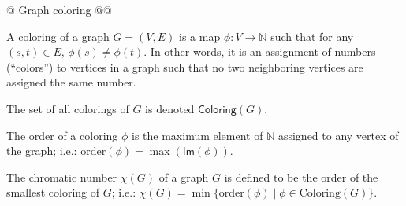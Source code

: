 \documentclass[]{article}
\newcommand{\textbs}[1]{{\sffamily\fontseries{sbc}\selectfont #1}}
\newcommand{\mbb}[1]{\ensuremath{\mathbb{#1}}}     %
\newcommand{\mrm}[1]{\ensuremath{\mathrm{#1}}}     %
\newcommand{\msf}[1]{\ensuremath{\mathsf{#1}}}     %
\newcommand{\define}[1]{\textbs{#1}}
\begin{document}
\begin{easylist}[itemize]
@ Graph coloring
@@ {%
  A \define{coloring} of a graph $G = (V, E)$ is a map $\phi : V \to \mbb{N}$
  such that for any $(s, t) \in E$, $\phi(s) \neq \phi(t)$. In other words, it
  is an assignment of numbers (``colors'') to vertices in a graph such that no
  two neighboring vertices are assigned the same number.

  The set of all colorings of $G$ is denoted $\msf{Coloring}(G)$.

  The \define{order} of a coloring $\phi$ is the maximum element of $\mbb{N}$
  assigned to any vertex of the graph;
  i.e.: $\mrm{order}(\phi) = \max(\msf{Im}(\phi))$.

  The \define{chromatic number} $\chi(G)$ of a graph $G$ is defined to be the
  order of the smallest coloring of $G$;
  i.e.: $\chi(G) = \min\{\mrm{order}(\phi) \mid \phi \in \mrm{Coloring}(G)\}$.

}
\end{easylist}
\end{document}
